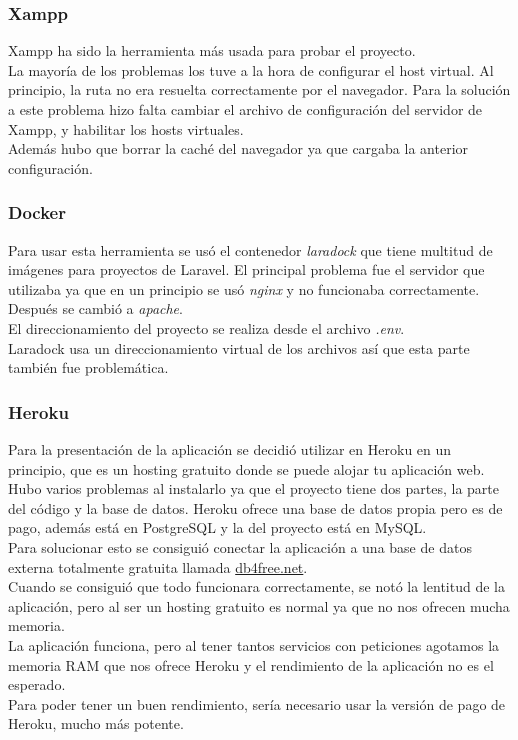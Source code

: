 \subsubsection{Xampp}
Xampp ha sido la herramienta más usada para probar el proyecto.\\
La mayoría de los problemas los tuve a la hora de configurar el host virtual.
Al principio, la ruta no era resuelta correctamente por el navegador. Para la solución a este problema hizo falta cambiar el archivo de configuración del servidor de Xampp, y habilitar los hosts virtuales.\\
Además hubo que borrar la caché del navegador ya que cargaba la anterior configuración.
\subsubsection{Docker}
Para usar esta herramienta se usó el contenedor \textit{laradock} que tiene multitud de imágenes para proyectos de Laravel. El principal problema fue el servidor que utilizaba ya que en un principio se usó \textit{nginx} y no funcionaba correctamente. Después se cambió a \textit{apache}.\\
El direccionamiento del proyecto se realiza desde el archivo \textit{.env}.\\
Laradock usa un direccionamiento virtual de los archivos así que esta parte también fue problemática.\\
\subsubsection{Heroku}
Para la presentación de la aplicación se decidió utilizar en Heroku en un principio, que es un hosting gratuito donde se puede alojar tu aplicación web. Hubo varios problemas al instalarlo ya que el proyecto tiene dos partes, la parte del código y la base de datos. Heroku ofrece una base de datos propia pero es de pago, además está en PostgreSQL y la del proyecto está en MySQL.\\
Para solucionar esto se consiguió conectar la aplicación a una base de datos externa totalmente gratuita llamada \href{https://www.db4free.net/}{db4free.net}.\\
Cuando se consiguió que todo funcionara correctamente, se notó la lentitud de la aplicación, pero al ser un hosting gratuito
es normal ya que no nos ofrecen mucha memoria.\\
La aplicación funciona, pero al tener tantos servicios con peticiones agotamos la memoria RAM que nos ofrece Heroku y el rendimiento de la aplicación no es el esperado.\\
Para poder tener un buen rendimiento, sería necesario usar la versión de pago de Heroku, mucho más potente.






